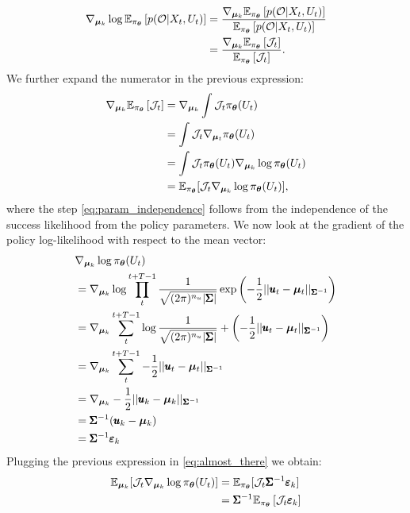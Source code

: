 \begin{align}
    \nabla_{\boldsymbol{\mu}_k} \log \mathbb{E}_{\pi_{\boldsymbol{\theta}}} \left [p(\mathcal{O} | X_t, U_t)\right]
    &= \frac{\nabla_{\boldsymbol{\mu}_k} \mathbb{E}_{\pi_{\boldsymbol{\theta}}} \left [p(\mathcal{O} | X_t, U_t)\right]}{\mathbb{E}_{\pi_{\boldsymbol{\theta}}} \left [p(\mathcal{O} | X_t, U_t)\right]} \\
    &= \frac{\nabla_{\boldsymbol{\mu}_k} \mathbb{E}_{\pi_{\boldsymbol{\theta}}} \left [\mathcal{J}_t\right]}{\mathbb{E}_{\pi_{\boldsymbol{\theta}}} \left [\mathcal{J}_t\right]}. \label{eq:log_gradient}
\end{align}
%
 We further expand the numerator in the previous expression:
\begin{align}
    \nabla_{\boldsymbol{\mu}_k} \mathbb{E}_{\pi_{\boldsymbol{\theta}}} \left [\mathcal{J}_t\right] 
    &= \nabla_{\boldsymbol{\mu}_k} \int \mathcal{J}_t \pi_{\boldsymbol{\theta}}(U_t) \label{eq:param_independence}\\
    &= \int \mathcal{J}_t \nabla_{\boldsymbol{\mu}_t} \pi_{\boldsymbol{\theta}}(U_t) \\
    &= \int \mathcal{J}_t \pi_{\boldsymbol{\theta}}(U_t) \nabla_{\boldsymbol{\mu}_k} \log \pi_{\boldsymbol{\theta}}(U_t) \\
    &= \mathbb{E}_{\pi_{\boldsymbol{\theta}}} [\mathcal{J}_t \nabla_{\boldsymbol{\mu}_k} \log \pi_{\boldsymbol{\theta}}(U_t)], \label{eq:almost_there}
\end{align}
where the step \eqref{eq:param_independence} follows from the independence of the success likelihood from the policy parameters. We now look at the gradient of the policy log-likelihood with respect to the mean vector:
\begin{align}
    &\nabla_{\boldsymbol{\mu}_k} \log \pi_{\boldsymbol{\theta}}(U_t) \\
    &= \nabla_{\boldsymbol{\mu}_k} \log \prod_{t}^{t+T-1} \frac{1}{\sqrt{(2\pi)^{n_u}|\pmb{\Sigma}|}}\exp\left(-\frac{1}{2}||\pmb{u}_t - \boldsymbol{\mu}_t||_{\pmb{\Sigma}^{-1}}\right) \\
    &= \nabla_{\boldsymbol{\mu}_k} \sum_{t}^{t+T-1} \log \frac{1}{\sqrt{(2\pi)^{n_u}|\pmb{\Sigma}|}} + \left(-\frac{1}{2}||\pmb{u}_t - \boldsymbol{\mu}_t||_{\pmb{\Sigma}^{-1}}\right) \\
    &= \nabla_{\boldsymbol{\mu}_k} \sum_{t}^{t+T-1} -\frac{1}{2}||\pmb{u}_t - \boldsymbol{\mu}_t||_{\pmb{\Sigma}^{-1}} \\
    &= \nabla_{\boldsymbol{\mu}_k} -\frac{1}{2}||\pmb{u}_k - \boldsymbol{\mu}_k||_{\pmb{\Sigma}^{-1}} \\
    &= \pmb{\Sigma}^{-1}(\pmb{u}_k - \boldsymbol{\mu}_k) \\
    &= \pmb{\Sigma}^{-1} \pmb{\varepsilon}_k
\end{align}
Plugging the previous expression in \eqref{eq:almost_there} we obtain:
\begin{align}
    \mathbb{E}_{\boldsymbol{\mu}_k} [\mathcal{J}_t \nabla_{\boldsymbol{\mu}_k} \log \pi_{\boldsymbol{\theta}}(U_t)]
    &= \mathbb{E}_{\pi_{\boldsymbol{\theta}}} [\mathcal{J}_t \pmb{\Sigma}^{-1} \pmb{\varepsilon}_k] \\
    &= \pmb{\Sigma}^{-1} \mathbb{E}_{\pi_{\boldsymbol{\theta}}} \left [\mathcal{J}_t \pmb{\varepsilon}_k\right] \label{eq:mean_gradient}
\end{align}

